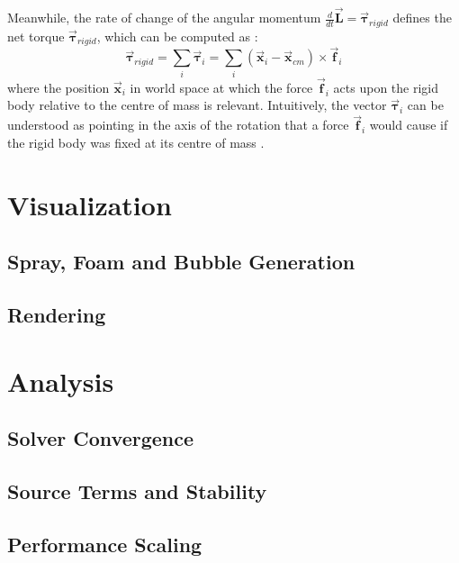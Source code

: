 \documentclass[oneside, a4paper]{book}
\newcommand\vek[1]{\vec{\bm{#1}}}
\begin{document}
    Meanwhile, the rate of change of the angular momentum  $\frac{d}{dt}\vek{L}=\vek{\tau}_{rigid}$ defines the net torque $\vek{\tau}_{rigid}$, which can be computed as \autocite{physically-based-rigids}:
    \begin{equation}
      \vek{\tau}_{rigid} = \sum_i \vek{\tau}_i = \sum_i (\vek{x}_i-\vek{x}_{cm}) \times \vek{f}_i
    \end{equation}
    where the position $\vek{x}_i$ in world space at which the force $\vek{f}_i$ acts upon the rigid body relative to the centre of mass is relevant. Intuitively, the vector $\vek{\tau}_i$ can be understood as pointing in the axis of the rotation that a force $\vek{f}_i$ would cause if the rigid body was fixed at its centre of mass \autocite{physically-based-rigids}.

    


\chapter{Visualization}\label{chp:visualization}
    \section{Spray, Foam and Bubble Generation}
    \section{Rendering}
\chapter{Analysis}\label{chp:analysis}
    \section{Solver Convergence}
    \section{Source Terms and Stability}
    \section{Performance Scaling}
\end{document}
